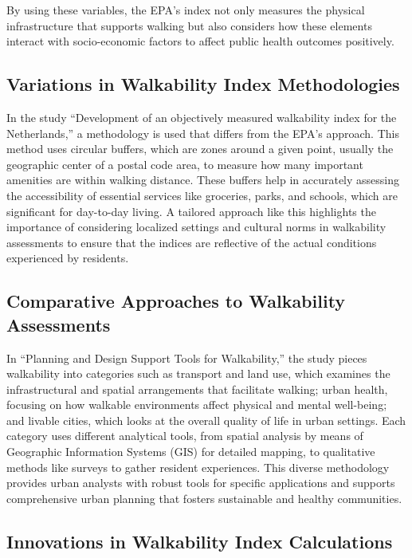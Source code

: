 \documentclass[
]{article}
\begin{document}
By using these variables, the EPA's index not only measures the physical
infrastructure that supports walking but also considers how these
elements interact with socio-economic factors to affect public health
outcomes positively.

\subsection{Variations in Walkability Index
Methodologies}\label{variations-in-walkability-index-methodologies}

In the study ``Development of an objectively measured walkability index
for the Netherlands,'' a methodology is used that differs from the EPA's
approach. This method uses circular buffers, which are zones around a
given point, usually the geographic center of a postal code area, to
measure how many important amenities are within walking distance. These
buffers help in accurately assessing the accessibility of essential
services like groceries, parks, and schools, which are significant for
day-to-day living. A tailored approach like this highlights the
importance of considering localized settings and cultural norms in
walkability assessments to ensure that the indices are reflective of the
actual conditions experienced by residents.

\subsection{Comparative Approaches to Walkability
Assessments}\label{comparative-approaches-to-walkability-assessments}

In ``Planning and Design Support Tools for Walkability,'' the study
pieces walkability into categories such as transport and land use, which
examines the infrastructural and spatial arrangements that facilitate
walking; urban health, focusing on how walkable environments affect
physical and mental well-being; and livable cities, which looks at the
overall quality of life in urban settings. Each category uses different
analytical tools, from spatial analysis by means of Geographic
Information Systems (GIS) for detailed mapping, to qualitative methods
like surveys to gather resident experiences. This diverse methodology
provides urban analysts with robust tools for specific applications and
supports comprehensive urban planning that fosters sustainable and
healthy communities.

\subsection{Innovations in Walkability Index
Calculations}\label{innovations-in-walkability-index-calculations}
\end{document}
